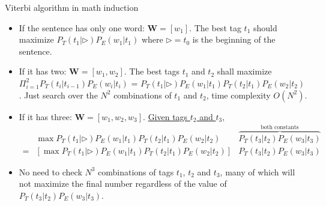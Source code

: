 \documentclass[11pt]{beamer}
\newcommand{\argmaxF}{\mathop{\mathrm{argmax}}\limits}
\begin{document}
\begin{frame}{Viterbi algorithm in math induction}
  \begin{itemize}[<+->]
    \item If the sentence has only one word: $\mathbf{W}= [w_1]$. The best tag  $t_1$ should  maximize $P_T(t_1|\rhd) P_E(w_1|t_1)$ where $\rhd=t_0$ is the beginning of the sentence. 
     \item If it has two: $\mathbf{W}= [w_1, w_2]$.  The best tags $t_1$ and $t_2$ shall maximize 
      $\Pi_{i=1}^{2} P_T(t_i|t_{i-1}) P_E(w_i|t_i)$ = $P_T(t_1|\rhd) P_E(w_1|t_1)  P_T(t_2|t_1) P_E(w_2|t_2)$. Just search over the $N^2$ combinations of $t_1$ and $t_2$, time complexity $O(N^2)$.
    \item If it has three: $\mathbf{W}= [w_1, w_2, w_3]$. \underline{Given tags $t_2$ and  $t_3$}, 
    \begin{align*}
    &  \max P_T(t_1|\rhd) P_E(w_1| t_1) P_T(t_2|t_1) P_E(w_2| t_2) & \overbrace{P_T(t_3|t_2) P_E(w_3| t_3)}^{\text{both constants}} \\
    = &  \left [   \max P_T(t_1|\rhd) P_E(w_1| t_1) P_T(t_2|t_1) P_E(w_2| t_2)  \right ]  & P_T(t_3|t_2) P_E(w_3| t_3)
    \end{align*}
    \item %
     No need to check $N^3$ combinations of tags $t_1$, $t_2$ and $t_3$, many of which will not maximize the final number regardless of the value of $P_T(t_3|t_2) P_E(w_3| t_3)$.
  \end{itemize}
\end{frame}
\end{document}

